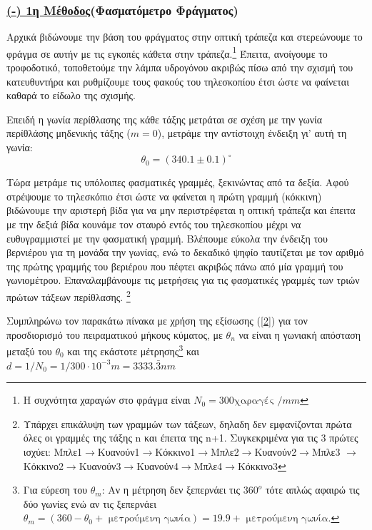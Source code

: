 \documentclass[a4paper]{article}
\begin{document}
\subsubsection*{\textbf{\underline{(-) 1η Μέθοδος}(Φασματόμετρο Φράγματος)}}

Αρχικά βιδώνουμε την βάση του φράγματος στην οπτική τράπεζα και στερεώνουμε το φράγμα σε αυτήν με τις εγκοπές κάθετα στην τράπεζα.\footnote{Η συχνότητα χαραγών στο φράγμα είναι $N_0=300  \text{χαραγές } / mm$}
Έπειτα, ανοίγουμε το τροφοδοτικό, τοποθετούμε την λάμπα υδρογόνου ακριβώς πίσω από την σχισμή του κατευθυντήρα και ρυθμίζουμε τους φακούς του τηλεσκοπίου έτσι ώστε να φαίνεται καθαρά το είδωλο της σχισμής. 

Επειδή η γωνία περίθλασης της κάθε τάξης μετράται σε σχέση με την γωνία περίθλάσης μηδενικής τάξης ($m=0$), μετράμε την αντίστοιχη ένδειξη γι' αυτή τη γωνία: 
$$ \theta_0 = ( 340.1 \pm 0.1 ) ^{\circ} $$ 




Τώρα μετράμε τις υπόλοιπες φασματικές γραμμές, ξεκινώντας από τα δεξία. Αφού στρέψουμε το τηλεσκόπιο έτσι ώστε να φαίνεται η πρώτη γραμμή (κόκκινη) βιδώνουμε την αριστερή βίδα για να μην περιστρέφεται η οπτική τράπεζα και έπειτα με την δεξιά βίδα κουνάμε τον σταυρό εντός του τηλεσκοπίου μέχρι να ευθυγραμμιστεί με την φασματική γραμμή. 
\newline
Βλέπουμε εύκολα την ένδειξη του βερνιέρου για τη μονάδα την γωνίας, ενώ το δεκαδικό ψηφίο ταυτίζεται με τον αριθμό της πρώτης γραμμής του βεριέρου που πέφτει ακριβώς πάνω από μία γραμμή του γωνιομέτρου.
Επαναλαμβάνουμε τις μετρήσεις για τις φασματικές γραμμές των τριών πρώτων τάξεων περίθλασης. 
\footnote{Υπάρχει επικάλυψη των γραμμών των τάξεων, δηλαδη δεν εμφανίζονται πρώτα όλες οι γραμμές της τάξης n και έπειτα της n+1. Συγκεκριμένα για τις 3 πρώτες ισχύει: \newline 
Μπλε1$\rightarrow$Κυανούν1$\rightarrow$Κόκκινο1$\rightarrow$Μπλε2$\rightarrow$Κυανούν2$\rightarrow$Μπλε3
$\rightarrow$Κόκκινο2$\rightarrow$Κυανούν3$\rightarrow$Κυανούν4$\rightarrow$Μπλε4$\rightarrow$Κόκκινο3}
\newline

Συμπληρώνω τον παρακάτω πίνακα με χρήση της εξίσωσης (\ref{2}) για τον προσδιορισμό του πειραματικού μήκους κύματος, με $\theta_n$ να είναι η γωνιακή απόσταση μεταξύ του $\theta_0$ και της εκάστοτε μέτρησης\footnote{Για εύρεση του $\theta_m$: Αν η μέτρηση δεν ξεπερνάει τις $360^{ο}$ τότε απλώς αφαιρώ τις δύο γωνίες ενώ αν τις ξεπερνάει $\theta_m =( 360-\theta_0 + \text{ μετρούμενη γωνία}) = 19.9 + \text{ μετρούμενη γωνία}$.}
και $ d = 1/N_0 = 1/300 \cdot 10^{-3}m=3333.\bar{3} nm$
\end{document}
